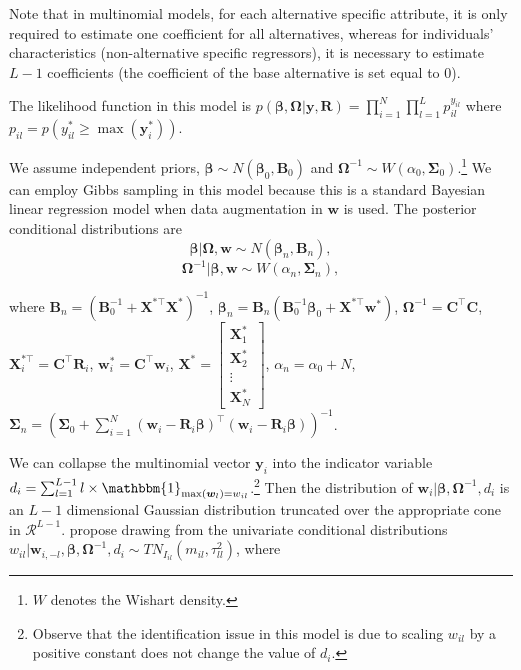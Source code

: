 Note that in multinomial models, for each alternative specific attribute, it is only required to estimate one coefficient for all alternatives, whereas for individuals' characteristics (non-alternative specific regressors), it is necessary to estimate $L-1$ coefficients (the coefficient of the base alternative is set equal to 0).

The likelihood function in this model is $p(\bm{\beta},\bm{\Omega}|\bm{y},\bm{R})=\prod_{i=1}^N\prod_{l=1}^L p_{il}^{y_{il}}$ where $p_{il}=p(y_{il}^*\geq \max(\bm{y}_i^*))$.

We assume independent priors, $\bm{\beta}\sim N(\bm{\beta}_0,\bm{B}_0)$ and $\bm{\Omega}^{-1}\sim W(\alpha_0,\bm{\Sigma}_0)$.\footnote{$W$ denotes the Wishart density.} We can employ Gibbs sampling in this model because this is a standard Bayesian linear regression model when data augmentation in $\bm{w}$ is used.
The posterior conditional distributions are
\begin{equation*}
	\bm{\beta}|\bm{\Omega},\bm{w}\sim{N}(\bm{\beta}_n,\bm{B}_n),
\end{equation*}
\begin{equation*}
	\bm{\Omega}^{-1}|\bm{\beta},\bm{w}\sim{W}(\alpha_n,\bm{\Sigma}_n),
\end{equation*}

where $\bm{B}_n=(\bm{B}_0^{-1}+\bm{X}^{*\top}\bm{X}^*)^{-1}$, $\bm{\beta}_n=\bm{B}_n(\bm{B}_0^{-1}\bm{\beta}_0+\bm{X}^{*\top}\bm{w}^*)$, $\bm{\Omega}^{-1}=\bm{C}^{\top}\bm{C}$, $\bm{X}_i^{*\top}=\bm{C}^{\top}\bm{R}_i$, $\bm{w}_i^*=\bm{C}^{\top}\bm{w}_i$, $\bm{X}^*=\begin{bmatrix}\bm{X}_1^*\\
	\bm{X}_2^*\\
	\vdots\\
	\bm{X}_N^*
\end{bmatrix}$, $\alpha_n=\alpha_0+N$, $\bm{\Sigma}_n=(\bm{\Sigma}_0+\sum_{i=1}^N (\bm{w}_i-\bm{R}_i\bm{\beta})^{\top}(\bm{w}_i-\bm{R}_i\bm{\beta}))^{-1}$.

We can collapse the multinomial vector $\bm{y}_i$ into the indicator variable $d_i=\sum_{l=1}^{L-1}l\times \mathbbm{1}_{\max(\bm{w}_{l})=w_{il}}$.\footnote{Observe that the identification issue in this model is due to scaling $w_{il}$ by a positive constant does not change the value of $d_i$.} Then the distribution of $\bm{w}_i|\bm{\beta},\bm{\Omega}^{-1},d_i$ is an $L-1$ dimensional Gaussian distribution truncated over the appropriate cone in $\mathcal{R}^{L-1}$.
\cite{McCulloch1994} propose drawing from the univariate conditional distributions $w_{il}|\bm{w}_{i,-l},\bm{\beta},\bm{\Omega}^{-1},d_i\sim TN_{I_{il}}(m_{il},\tau_{ll}^2)$, where 

